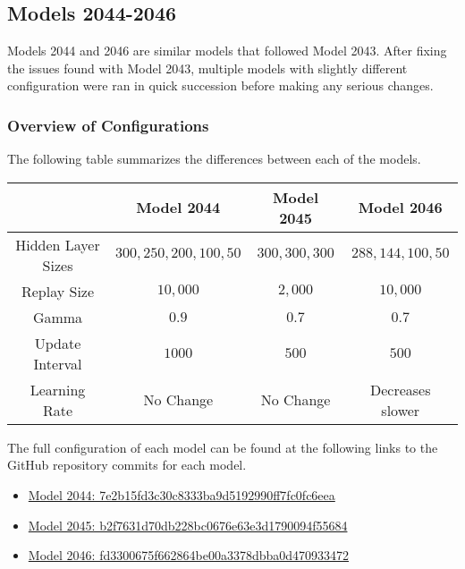 \documentclass[12pt]{article}
\begin{document}
\newpage


\subsection{Models 2044-2046}

Models 2044 and 2046 are similar models that followed Model 2043. After fixing the issues found with Model 2043, multiple models with slightly different configuration were ran in quick succession before making any serious changes.

\subsubsection{Overview of Configurations}

The following table summarizes the differences between each of the models.

\begin{center}
	\begin{tabular}{| c | c | c | c |}
		\hline
		& Model 2044 & Model 2045 & Model 2046 \\
		\hline
		\hline
		Hidden Layer Sizes & $300,250,200,100,50$ & $300,300,300$ & $288, 144, 100, 50$ \\
		\hline
		Replay Size & $10,000$ & $2,000$ & $10,000$ \\
		\hline
		Gamma & $0.9$ & $0.7$ & $0.7$ \\
		\hline
		Update Interval & $1000$ & $500$ & $500$ \\
		\hline
		Learning Rate & No Change & No Change & Decreases slower \\
		\hline
	\end{tabular}

\end{center}

The full configuration of each model can be found at the following links to the GitHub repository commits for each model.


\begin{itemize}
	\item \href{https://www.github.com/LittleTealeaf/mlcube/tree/7e2b15fd3c30c8333ba9d5192990ff7fc0fc6eea}{Model 2044: 7e2b15fd3c30c8333ba9d5192990ff7fc0fc6eea}
	\item \href{https://www.github.com/LittleTealeaf/mlcube/tree/b2f7631d70db228bc0676e63e3d1790094f55684}{Model 2045: b2f7631d70db228bc0676e63e3d1790094f55684}
	\item \href{https://www.github.com/LittleTealeaf/mlcube/tree/fd3300675f662864be00a3378dbba0d470933472}{Model 2046: fd3300675f662864be00a3378dbba0d470933472}
\end{itemize}
\end{document}
